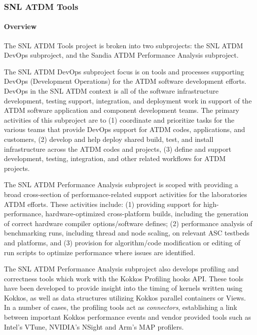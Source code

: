 \subsubsection{SNL ATDM Tools} 

\paragraph{Overview}

The SNL ATDM Tools project is broken into two subprojects: the SNL ATDM DevOps subproject, and the Sandia ATDM Performance Analysis subproject.

The SNL ATDM DevOps subproject focus is on tools and processes supporting DevOps (Development Operations) for the ATDM software development efforts.
DevOps in the SNL ATDM context is all of the software infrastructure development, testing support, integration, and deployment work in support of the ATDM software application and component development teams.
The primary activities of this subproject are to (1) coordinate and prioritize tasks for the various teams that provide DevOps support for ATDM codes, applications, and customers, (2) develop and help deploy shared build, test, and install infrastructure across the ATDM codes and projects, (3) define and support development, testing, integration, and other related workflows for ATDM projects.

The SNL ATDM Performance Analysis subproject is scoped with providing a broad cross-section of performance-related support activities for the laboratories ATDM efforts.
These activities include: (1) providing support for high-performance, hardware-optimized cross-platform builds, including the generation of correct hardware compiler options/software defines; (2) performance
analysis of benchmarking runs, including thread and node scaling, on relevant ASC testbeds and platforms, and (3) provision for algorithm/code modification or editing of run scripts to optimize performance where issues are identified.

The SNL ATDM Performance Analysis subproject also develops profiling and correctness tools which work with the Kokkos Profiling hooks API.
These tools have been developed to provide insight into the timing of kernels written using Kokkos, as well as data structures utilizing Kokkos parallel containers or Views.
In a number of cases, the profiling tools act as {\em connectors}, establishing a link between important Kokkos performance events and vendor provided tools such as Intel's VTune, NVIDIA's NSight and Arm's MAP profilers.

